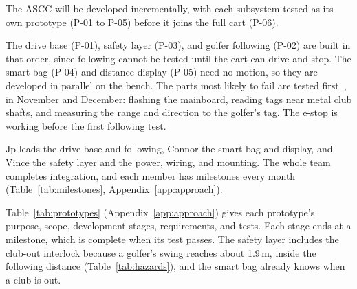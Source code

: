 \label{sec:approach}

\label{sec:approach-strategy}

The \ac{ASCC} will be developed incrementally, with each subsystem tested as its own prototype (P-01 to P-05) before it joins the full cart (P-06).

The drive base (P-01), safety layer (P-03), and golfer following (P-02) are built in that order, since following cannot be tested until the cart can drive and stop. The smart bag (P-04) and distance display (P-05) need no motion, so they are developed in parallel on the bench. The parts most likely to fail are tested first~\cite[\S 6.4]{nasaHandbook}, in November and December: flashing the mainboard, reading tags near metal club shafts, and measuring the range and direction to the golfer's tag. The e-stop is working before the first following test.

Jp leads the drive base and following, Connor the smart bag and display, and Vince the safety layer and the power, wiring, and mounting. The whole team completes integration, and each member has milestones every month (Table~\ref{tab:milestones}, Appendix~\ref{app:approach}).

\label{sec:approach-prototypes}

Table~\ref{tab:prototypes} (Appendix~\ref{app:approach}) gives each prototype's purpose, scope, development stages, requirements, and tests. Each stage ends at a milestone, which is complete when its test passes. The safety layer includes the club-out interlock because a golfer's swing reaches about 1.9\,m, inside the following distance (Table~\ref{tab:hazards}), and the smart bag already knows when a club is out.


